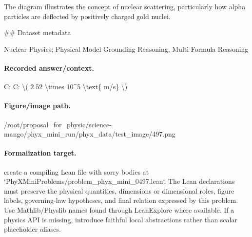 The diagram illustrates the concept of nuclear scattering, particularly how alpha particles are deflected by positively charged gold nuclei.

\#\# Dataset metadata

Nuclear Physics; Physical Model Grounding Reasoning, Multi-Formula Reasoning

\paragraph{Recorded answer/context.}
C: C: \textbackslash{}( 2.52 \textbackslash{}times 10\textasciicircum{}5 \textbackslash{}text\{ m/s\} \textbackslash{})

\paragraph{Figure/image path.}
/root/proposal\_for\_physic/science-mango/phyx\_mini\_run/phyx\_data/test\_image/497.png

\paragraph{Formalization target.}
create a compiling Lean file with sorry bodies at `PhyXMiniProblems/problem\_phyx\_mini\_0497.lean`. The Lean declarations must preserve the physical quantities, dimensions or dimensional roles, figure labels, governing-law hypotheses, and final relation expressed by this problem.
Use Mathlib/Physlib names found through LeanExplore where available. If a physics API is missing, introduce faithful local abstractions rather than scalar placeholder aliases.

